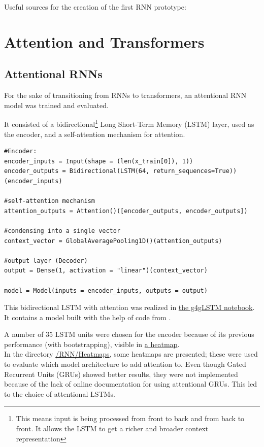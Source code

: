\documentclass{article}
\begin{document}
Useful sources for the creation of the first RNN prototype:
\cite{bowman2015recursiveneuralnetworkslearn, tensorflow_keras_rnn, ibm_rnn}


\section{Attention and Transformers}

\subsection{Attentional RNNs}
For the sake of transitioning from RNNs to transformers, an attentional RNN model was trained and evaluated.

It consisted of a bidirectional\footnote{This means input is being processed from front to back and from back to front. It allows the LSTM to get a richer and broader context representation} Long Short-Term Memory (LSTM) layer, used as the encoder, and a self-attention mechanism for attention.

\begin{Verbatim}
#Encoder:
encoder_inputs = Input(shape = (len(x_train[0]), 1))
encoder_outputs = Bidirectional(LSTM(64, return_sequences=True))(encoder_inputs)

#self-attention mechanism
attention_outputs = Attention()([encoder_outputs, encoder_outputs])

#condensing into a single vector
context_vector = GlobalAveragePooling1D()(attention_outputs)

#output layer (Decoder)
output = Dense(1, activation = "linear")(context_vector)

model = Model(inputs = encoder_inputs, outputs = output)
\end{Verbatim}

This bidirectional LSTM with attention was realized in \href{https://github.com/AntonStantan/matura/blob/main/attentional-RNN/g4gLSTM.ipynb}{the g4gLSTM notebook}. It contains a model built with the help of code from \cite{geeksforgeeks_attention_bilstm}.

A number of 35 LSTM units were chosen for the encoder because of its previous performance (with bootstrapping), visible in \href{https://github.com/AntonStantan/matura/blob/main/attentional-RNN/previousHeatmap.png}{a heatmap}.
\\[2em]
In the directory \href{https://github.com/AntonStantan/matura/tree/main/RNN/Heatmaps}{/RNN/Heatmaps}, some heatmaps are presented; these were used to evaluate which model architecture to add attention to. Even though Gated Recurrent Units (GRUs) showed better results, they were not implemented because of the lack of online documentation for using attentional GRUs. This led to the choice of attentional LSTMs.
\end{document}
